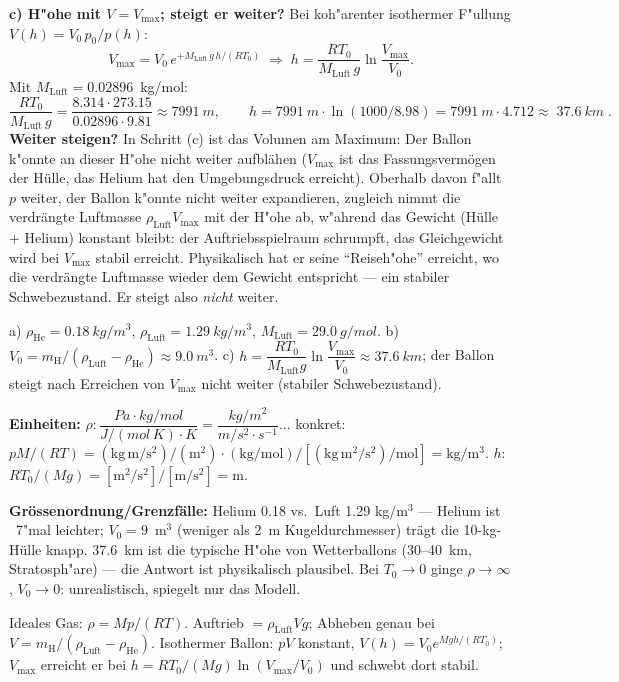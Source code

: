 \textbf{c) H"ohe mit $V=V_{\max}$; steigt er weiter?} Bei koh"arenter
isothermer F"ullung $V(h)=V_0\,p_0/p(h)$:
\begin{equation}
  V_{\max}=V_0\,e^{+M_{\mathrm{Luft}}\,g\,h/(R T_0)}
  \;\Rightarrow\;
  h=\frac{R T_0}{M_{\mathrm{Luft}}\,g}\ln\frac{V_{\max}}{V_0}.
\end{equation}
Mit $M_{\mathrm{Luft}}=0.02896$~kg/mol:
\begin{equation}
  \frac{R T_0}{M_{\mathrm{Luft}}\,g}
  =\frac{8.314\cdot273.15}{0.02896\cdot9.81}
  \approx\qty{7991}{m},\qquad
  h=\qty{7991}{m}\cdot\ln(1000/8.98)=\qty{7991}{m}\cdot4.712
  \approx\boxed{\;\qty{37.6}{km}\;}.
\end{equation}
\textbf{Weiter steigen?} In Schritt (c) ist das Volumen am Maximum: Der
Ballon k"onnte an dieser H"ohe nicht weiter aufbl\"ahen ($V_{\max}$ ist das
Fassungsvermögen der Hülle, das Helium hat den Umgebungsdruck erreicht).
Oberhalb davon f"allt $p$ weiter, der Ballon k"onnte nicht weiter expandieren,
zugleich nimmt die verdr\"angte Luftmasse $\rho_{\mathrm{Luft}}V_{\max}$ mit
der H"ohe ab, w"ahrend das Gewicht (Hülle + Helium) konstant bleibt:
der Auftriebsspielraum schrumpft, das Gleichgewicht wird bei $V_{\max}$
stabil erreicht. Physikalisch hat er seine ``Reiseh"ohe'' erreicht, wo die
verdr\"angte Luftmasse wieder dem Gewicht entspricht --- ein stabiler
Schwebezustand. Er steigt also \emph{nicht} weiter.

\begin{ergebnis}
a) $\rho_{\mathrm{He}}=\qty{0.18}{kg/m^3}$, $\rho_{\mathrm{Luft}}=\qty{1.29}{kg/m^3}$,
$M_{\mathrm{Luft}}=\qty{29.0}{g/mol}$.
b) $V_0=m_{\mathrm{H}}/(\rho_{\mathrm{Luft}}-\rho_{\mathrm{He}})\approx\qty{9.0}{m^3}$.
c) $h=\dfrac{RT_0}{M_{\mathrm{Luft}}g}\ln\dfrac{V_{\max}}{V_0}
\approx\qty{37.6}{km}$; der Ballon steigt nach Erreichen von $V_{\max}$
nicht weiter (stabiler Schwebezustand).
\end{ergebnis}

\begin{kontrolle}
\textbf{Einheiten:} $\rho\colon\dfrac{Pa\cdot kg/mol}{J/(mol\,K)\cdot K}
=\dfrac{kg/m^2}{m/s^2\cdot s^{-1}}$... konkret:
$pM/(RT)=(\mathrm{kg\,m/s^2})/(\mathrm{m^2})\cdot(\mathrm{kg/mol})
/[(\mathrm{kg\,m^2/s^2})/\mathrm{mol}]=\mathrm{kg/m^3}$. \checkmark
$h$: $RT_0/(Mg)=[\mathrm{m^2/s^2}]/[\mathrm{m/s^2}]=\mathrm m$. \checkmark

\textbf{Grössenordnung/Grenzfälle:} Helium 0.18 vs.\ Luft 1.29 kg/m$^3$ ---
Helium ist ~7"mal leichter; $V_0=9$~m$^3$ (weniger als 2~m Kugeldurchmesser)
trägt die 10-kg-Hülle knapp. 37.6~km ist die typische H"ohe von
Wetterballons (30--40~km, Stratosph"are) --- die Antwort ist physikalisch
plausibel. Bei $T_0\to0$ ginge $\rho\to\infty$, $V_0\to0$: unrealistisch,
spiegelt nur das Modell. \checkmark
\end{kontrolle}

\begin{merksatz}
Ideales Gas: $\rho=Mp/(RT)$. Auftrieb $=\rho_{\mathrm{Luft}}Vg$; Abheben
genau bei $V=m_{\mathrm{H}}/(\rho_{\mathrm{Luft}}-\rho_{\mathrm{He}})$.
Isothermer Ballon: $pV$ konstant, $V(h)=V_0e^{Mgh/(RT_0)}$; $V_{\max}$
erreicht er bei $h=RT_0/(Mg)\ln(V_{\max}/V_0)$ und schwebt dort stabil.
\end{merksatz}
